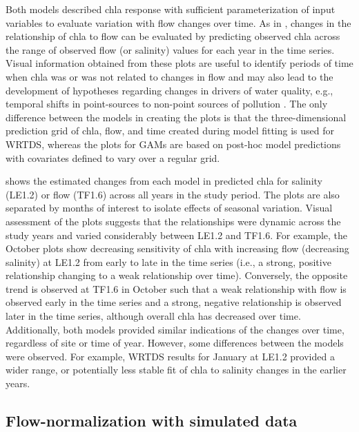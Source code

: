 \documentclass{svjour3}\usepackage[]{graphicx}\usepackage[]{color}
\begin{document}
Both models described \ac{chla} response with sufficient parameterization of input variables to evaluate variation with flow changes over time.  As in \cite{Beck15}, changes in the relationship of \ac{chla} to flow can be evaluated by predicting observed \ac{chla} across the range of observed flow (or salinity) values for each year in the time series.  Visual information obtained from these plots are useful to identify periods of time when \ac{chla} was or was not related to changes in flow and may also lead to the development of hypotheses regarding changes in drivers of water quality, e.g., temporal shifts in point-sources to non-point sources of pollution \cite{Hirsch10,Beck15}.  The only difference between the models in creating the plots is that the three-dimensional prediction grid of \ac{chla}, flow, and time created during model fitting is used for \ac{WRTDS}, whereas the plots for \acp{GAM} are based on post-hoc model predictions with covariates defined to vary over a regular grid. 

 shows the estimated changes from each model in predicted \ac{chla} for salinity (LE1.2) or flow (TF1.6) across all years in the study period.  The plots are also separated by months of interest to isolate effects of seasonal variation.  Visual assessment of the plots suggests that the relationships were dynamic across the study years and varied considerably between LE1.2 and TF1.6.  For example, the October plots show decreasing sensitivity of \ac{chla} with increasing flow (decreasing salinity) at LE1.2 from early to late in the time series (i.e., a strong, positive relationship changing to a weak relationship over time).  Conversely, the opposite trend is observed at TF1.6 in October such that a weak relationship with flow is observed early in the time series and a strong, negative relationship is observed later in the time series, although overall \ac{chla} has decreased over time.  Additionally, both models provided similar indications of the changes over time, regardless of site or time of year.  However, some differences between the models were observed.  For example, \ac{WRTDS} results for January at LE1.2 provided a wider range, or potentially less stable fit of \ac{chla} to salinity changes in the earlier years.

\subsection{Flow-normalization with simulated data}
\end{document}
